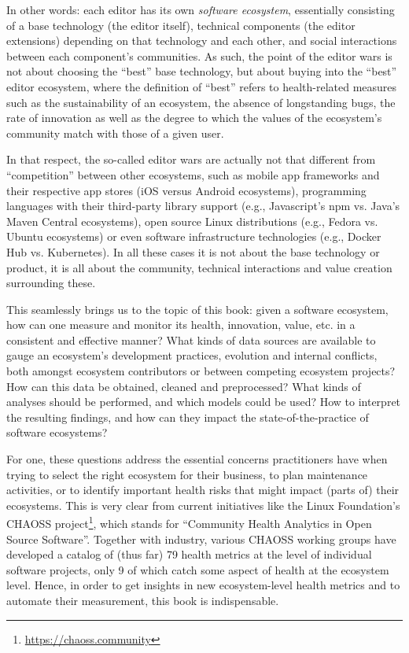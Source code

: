 In other words: each editor has its own {\em software ecosystem}, essentially consisting of a base technology (the editor itself), technical components (the editor extensions) depending on that technology and each other, and social interactions between each component's communities. As such, the point of the editor wars is not about choosing the ``best'' base technology, but about buying into the ``best'' editor ecosystem, where the definition of ``best'' refers to health-related measures such as the sustainability of an ecosystem, the absence of longstanding bugs, the rate of innovation as well as the degree to which the values of the ecosystem's community match with those of a given user.

In that respect, the so-called editor wars are actually not that different from ``competition'' between other ecosystems, such as mobile app frameworks and their respective app stores (\eg iOS versus Android ecosystems), programming languages with their third-party library support (e.g., Javascript's npm vs. Java's Maven Central ecosystems), open source Linux distributions (e.g., Fedora vs. Ubuntu ecosystems) or even software infrastructure technologies (e.g., Docker Hub vs. Kubernetes). In all these cases it is not about the base technology or product, it is all about the community, technical interactions and value creation surrounding these.

\bigskip
This seamlessly brings us to the topic of this book: given a software ecosystem, how can one measure and monitor its health, innovation, value, etc. in a consistent and effective manner? What kinds of data sources are available to gauge an ecosystem's development practices, evolution and internal conflicts, both amongst ecosystem contributors or between competing ecosystem projects? How can this data be obtained, cleaned and preprocessed? What kinds of analyses should be performed, and which models could be used? How to interpret the resulting findings, and how can they impact the state-of-the-practice of software ecosystems?

For one, these questions address the essential concerns practitioners have when trying to select the right ecosystem for their business, to plan maintenance activities, or to identify important health risks that might impact (parts of) their ecosystems. This is very clear from current initiatives like the Linux Foundation's CHAOSS project\footnote{\url{https://chaoss.community}}, which stands for ``Community Health Analytics in Open Source Software''. Together with industry, various CHAOSS working groups have developed a catalog of (thus far) 79 health metrics at the level of individual software projects, only 9 of which catch some aspect of health at the ecosystem level. Hence, in order to get insights in new ecosystem-level health metrics and to automate their measurement, this book is indispensable.


